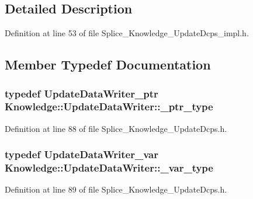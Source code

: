 \subsection{Detailed Description}


Definition at line 53 of file Splice\_\-Knowledge\_\-UpdateDcps\_\-impl.h.



\subsection{Member Typedef Documentation}
\hypertarget{classKnowledge_1_1UpdateDataWriter_aa60c888db648c0f608ef197ead80c9a6}{
\subsubsection[{\_\-ptr\_\-type}]{\setlength{\rightskip}{0pt plus 5cm}typedef {\bf UpdateDataWriter\_\-ptr} {\bf Knowledge::UpdateDataWriter::\_\-ptr\_\-type}}}
\label{d9/dbb/classKnowledge_1_1UpdateDataWriter_aa60c888db648c0f608ef197ead80c9a6}


Definition at line 88 of file Splice\_\-Knowledge\_\-UpdateDcps.h.

\hypertarget{classKnowledge_1_1UpdateDataWriter_a61f476a3f203c6b39a1995c70cf47526}{
\subsubsection[{\_\-var\_\-type}]{\setlength{\rightskip}{0pt plus 5cm}typedef {\bf UpdateDataWriter\_\-var} {\bf Knowledge::UpdateDataWriter::\_\-var\_\-type}}}
\label{d9/dbb/classKnowledge_1_1UpdateDataWriter_a61f476a3f203c6b39a1995c70cf47526}


Definition at line 89 of file Splice\_\-Knowledge\_\-UpdateDcps.h.



